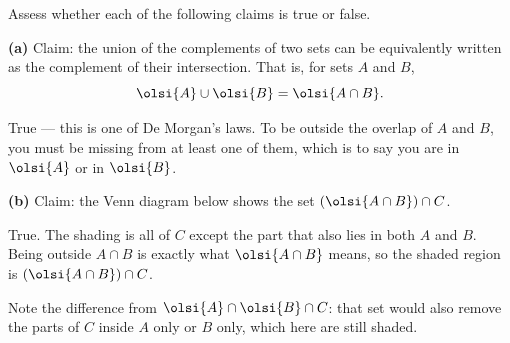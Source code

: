 \documentclass[12pt]{ximera}
\begin{document}
\begin{problem}
Assess whether each of the following claims is true or false.

\begin{prompt}
\textbf{(a)} Claim: the union of the complements of two sets can be equivalently
written as the complement of their intersection. That is, for sets $A$ and $B$,
\[ \olsi{A}\cup \olsi{B} = \olsi{A\cap B}. \]

\begin{multipleChoice}
\end{multipleChoice}

\begin{feedback}
True --- this is one of De Morgan's laws. To be outside the overlap of $A$ and $B$, you
must be missing from at least one of them, which is to say you are in $\olsi{A}$ or in
$\olsi{B}$.
\end{feedback}
\end{prompt}

\begin{prompt}
\textbf{(b)} Claim: the Venn diagram below shows the set
$\left(\olsi{A\cap B}\right)\cap C$.

\begin{center}
\end{center}

\begin{multipleChoice}
\end{multipleChoice}

\begin{feedback}
True. The shading is all of $C$ except the part that also lies in both $A$ and $B$.
Being outside $A\cap B$ is exactly what $\olsi{A\cap B}$ means, so the shaded region is
$\left(\olsi{A\cap B}\right)\cap C$.

Note the difference from $\olsi{A}\cap\olsi{B}\cap C$: that set would also remove the
parts of $C$ inside $A$ only or $B$ only, which here are still shaded.
\end{feedback}
\end{prompt}
\end{problem}
\end{document}
